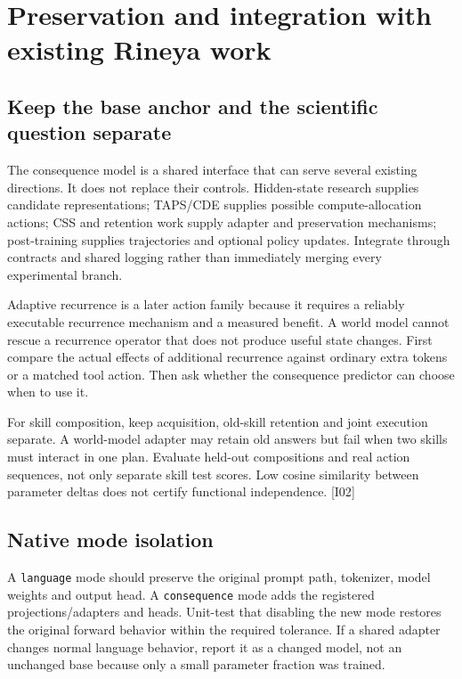 \documentclass[
  11pt,
  a4paper,
]{article}
\begin{document}
\section{Preservation and integration with existing Rineya
work}\label{preservation-and-integration-with-existing-rineya-work}

\subsection{Keep the base anchor and the scientific question
separate}\label{keep-the-base-anchor-and-the-scientific-question-separate}

The consequence model is a shared interface that can serve several
existing directions. It does not replace their controls. Hidden-state
research supplies candidate representations; TAPS/CDE supplies possible
compute-allocation actions; CSS and retention work supply adapter and
preservation mechanisms; post-training supplies trajectories and
optional policy updates. Integrate through contracts and shared logging
rather than immediately merging every experimental branch.

Adaptive recurrence is a later action family because it requires a
reliably executable recurrence mechanism and a measured benefit. A world
model cannot rescue a recurrence operator that does not produce useful
state changes. First compare the actual effects of additional recurrence
against ordinary extra tokens or a matched tool action. Then ask whether
the consequence predictor can choose when to use it.

For skill composition, keep acquisition, old-skill retention and joint
execution separate. A world-model adapter may retain old answers but
fail when two skills must interact in one plan. Evaluate held-out
compositions and real action sequences, not only separate skill test
scores. Low cosine similarity between parameter deltas does not certify
functional independence. {[}I02{]}

\subsection{Native mode isolation}\label{native-mode-isolation}

A \texttt{language} mode should preserve the original prompt path,
tokenizer, model weights and output head. A \texttt{consequence} mode
adds the registered projections/adapters and heads. Unit-test that
disabling the new mode restores the original forward behavior within the
required tolerance. If a shared adapter changes normal language
behavior, report it as a changed model, not an unchanged base because
only a small parameter fraction was trained.
\end{document}
